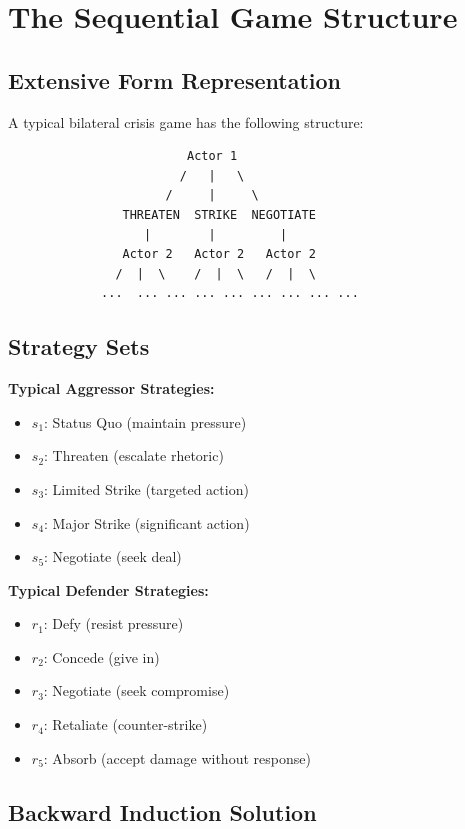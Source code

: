 \section{The Sequential Game Structure}
\label{sec:crisis-game}

\subsection{Extensive Form Representation}

A typical bilateral crisis game has the following structure:

\begin{verbatim}
                         Actor 1
                        /   |   \
                      /     |     \
                THREATEN  STRIKE  NEGOTIATE
                   |        |         |
                Actor 2   Actor 2   Actor 2
               /  |  \    /  |  \   /  |  \
             ...  ... ... ... ... ... ... ... ...
\end{verbatim}

\subsection{Strategy Sets}

\textbf{Typical Aggressor Strategies:}
\begin{itemize}
\item $s_1$: Status Quo (maintain pressure)
\item $s_2$: Threaten (escalate rhetoric)
\item $s_3$: Limited Strike (targeted action)
\item $s_4$: Major Strike (significant action)
\item $s_5$: Negotiate (seek deal)
\end{itemize}

\textbf{Typical Defender Strategies:}
\begin{itemize}
\item $r_1$: Defy (resist pressure)
\item $r_2$: Concede (give in)
\item $r_3$: Negotiate (seek compromise)
\item $r_4$: Retaliate (counter-strike)
\item $r_5$: Absorb (accept damage without response)
\end{itemize}

\subsection{Backward Induction Solution}

